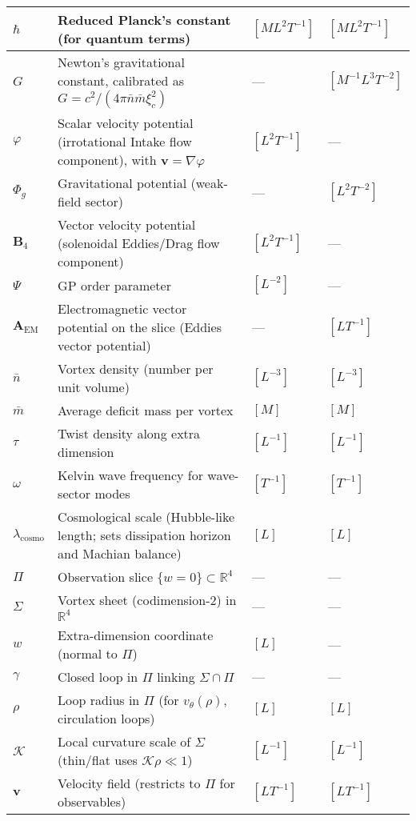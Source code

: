 \begin{table}[H]
\begin{tabularx}{\textwidth}{|l|Y|l|l|}
\hline
$\hbar$ & Reduced Planck's constant (for quantum terms) & $[M L^2 T^{-1}]$ & $[M L^2 T^{-1}]$ \\
\hline
$G$ & Newton's gravitational constant, calibrated as $G = c^2 / (4\pi \bar{n} \bar{m} \xi_c^2)$ & --- & $[M^{-1} L^3 T^{-2}]$ \\
\hline
$\varphi$ & Scalar velocity potential (irrotational Intake flow component), with $\mathbf v=\nabla\varphi$ & $[L^2 T^{-1}]$ & --- \\
\hline
$\Phi_g$ & Gravitational potential (weak-field sector) & --- & $[L^2 T^{-2}]$ \\
\hline
$\mathbf{B}_4$ & Vector velocity potential (solenoidal Eddies/Drag flow component) & $[L^2 T^{-1}]$ & --- \\
\hline
$\Psi$ & GP order parameter & $[L^{-2}]$ & --- \\
\hline
$\mathbf{A}_{\text{EM}}$ & Electromagnetic vector potential on the slice (Eddies vector potential) & --- & $[L T^{-1}]$ \\
\hline
$\bar{n}$ & Vortex density (number per unit volume) & $[L^{-3}]$ & $[L^{-3}]$ \\
\hline
$\bar{m}$ & Average deficit mass per vortex & $[M]$ & $[M]$ \\
\hline
$\tau$ & Twist density along extra dimension & $[L^{-1}]$ & $[L^{-1}]$ \\
\hline
$\omega$ & Kelvin wave frequency for wave-sector modes & $[T^{-1}]$ & $[T^{-1}]$ \\
\hline
$\lambda_{\text{cosmo}}$ & Cosmological scale (Hubble-like length; sets dissipation horizon and Machian balance) & $[L]$ & $[L]$ \\
\hline
$\Pi$ & Observation slice $\{w=0\}\subset\mathbb{R}^4$ & --- & --- \\
\hline
$\Sigma$ & Vortex sheet (codimension-2) in $\mathbb{R}^4$ & --- & --- \\
\hline
$w$ & Extra-dimension coordinate (normal to $\Pi$) & $[L]$ & --- \\
\hline
$\gamma$ & Closed loop in $\Pi$ linking $\Sigma\cap\Pi$ & --- & --- \\
\hline
$\rho$ & Loop radius in $\Pi$ (for $v_\theta(\rho)$, circulation loops) & $[L]$ & $[L]$ \\
\hline
$\mathcal{K}$ & Local curvature scale of $\Sigma$ (thin/flat uses $\mathcal{K}\rho\ll1$) & $[L^{-1}]$ & $[L^{-1}]$ \\
\hline
$\mathbf{v}$ & Velocity field (restricts to $\Pi$ for observables) & $[L T^{-1}]$ & $[L T^{-1}]$ \\

\end{tabularx}
\end{table}
